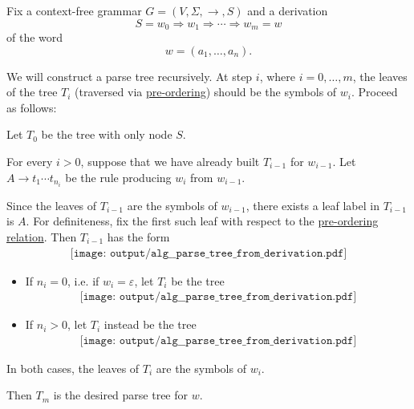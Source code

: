 \begin{algorithm}\label{alg:parse_tree_from_derivation}
  Fix a context-free grammar \( G = (V, \Sigma, \to, S) \) and a derivation
  \begin{equation*}
    S = w_0 \Rightarrow w_1 \Rightarrow \cdots \Rightarrow w_m = w
  \end{equation*}
  of the word
  \begin{equation*}
    w = (a_1, \ldots, a_n).
  \end{equation*}

  We will construct a parse tree recursively. At step \( i \), where \( i = 0, \ldots, m \), the leaves of the tree \( T_i \) (traversed via \hyperref[def:traversal_ordering]{pre-ordering}) should be the symbols of \( w_i \). Proceed as follows:
  \begin{thmenum}
     Let \( T_0 \) be the tree with only node \( S \).

     For every \( i > 0 \), suppose that we have already built \( T_{i-1} \) for \( w_{i-1} \). Let \( A \to t_1 \cdots t_{n_i} \) be the rule producing \( w_i \) from \( w_{i-1} \).

    Since the leaves of \( T_{i-1} \) are the symbols of \( w_{i-1} \), there exists a leaf label in \( T_{i-1} \) is \( A \). For definiteness, fix the first such leaf with respect to the \hyperref[def:traversal_ordering]{pre-ordering relation}. Then \( T_{i-1} \) has the form
    \begin{equation*}
      \begin{aligned}
        \texttt{[image: output/alg\_\_parse\_tree\_from\_derivation.pdf]}
      \end{aligned}
    \end{equation*}

    \begin{itemize}
      \item If \( n_i = 0 \), i.e. if \( w_i = \varepsilon \), let \( T_i \) be the tree
      \begin{equation*}
        \begin{aligned}
          \texttt{[image: output/alg\_\_parse\_tree\_from\_derivation.pdf]}
        \end{aligned}
      \end{equation*}

      \item If \( n_i > 0 \), let \( T_i \) instead be the tree
      \begin{equation*}
        \begin{aligned}
          \texttt{[image: output/alg\_\_parse\_tree\_from\_derivation.pdf]}
        \end{aligned}
      \end{equation*}
    \end{itemize}

    In both cases, the leaves of \( T_i \) are the symbols of \( w_i \).
  \end{thmenum}

  Then \( T_m \) is the desired parse tree for \( w \).
\end{algorithm}
